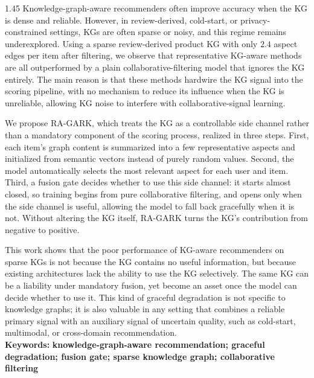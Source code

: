 \begin{spacing}{1.45}
Knowledge-graph-aware recommenders often improve accuracy when the KG is dense and reliable. However, in review-derived, cold-start, or privacy-constrained settings, KGs are often sparse or noisy, and this regime remains underexplored. Using a sparse review-derived product KG with only $2.4$ aspect edges per item after filtering, we observe that representative KG-aware methods are all outperformed by a plain collaborative-filtering model that ignores the KG entirely. The main reason is that these methods hardwire the KG signal into the scoring pipeline, with no mechanism to reduce its influence when the KG is unreliable, allowing KG noise to interfere with collaborative-signal learning.

We propose RA-GARK, which treats the KG as a controllable side channel rather than a mandatory component of the scoring process, realized in three steps. First, each item's graph content is summarized into a few representative aspects and initialized from semantic vectors instead of purely random values. Second, the model automatically selects the most relevant aspect for each user and item. Third, a fusion gate decides whether to use this side channel: it starts almost closed, so training begins from pure collaborative filtering, and opens only when the side channel is useful, allowing the model to fall back gracefully when it is not. Without altering the KG itself, RA-GARK turns the KG's contribution from negative to positive.

This work shows that the poor performance of KG-aware recommenders on sparse KGs is not because the KG contains no useful information, but because existing architectures lack the ability to use the KG selectively. The same KG can be a liability under mandatory fusion, yet become an asset once the model can decide whether to use it. This kind of graceful degradation is not specific to knowledge graphs; it is also valuable in any setting that combines a reliable primary signal with an auxiliary signal of uncertain quality, such as cold-start, multimodal, or cross-domain recommendation.\\[0.5\baselineskip]
\textbf{Keywords:} \textbf{knowledge-graph-aware recommendation; graceful degradation; fusion gate; sparse knowledge graph; collaborative filtering}
\end{spacing}
